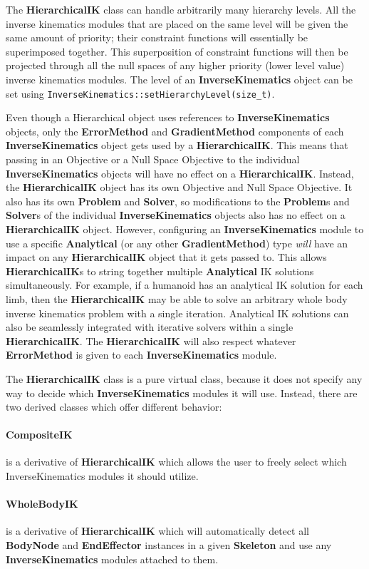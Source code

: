 The \textbf{HierarchicalIK} class can handle arbitrarily many hierarchy levels. All the inverse kinematics modules that are placed on the same level will be given the same amount of priority; their constraint functions will essentially be superimposed together. This superposition of constraint functions will then be projected through all the null spaces of any higher priority (lower level value) inverse kinematics modules. The level of an \textbf{InverseKinematics} object can be set using \texttt{InverseKinematics::setHierarchyLevel(size\_t)}.

Even though a Hierarchical object uses references to \textbf{InverseKinematics} objects, only the \textbf{ErrorMethod} and \textbf{GradientMethod} components of each \textbf{InverseKinematics} object gets used by a \textbf{HierarchicalIK}. This means that passing in an Objective or a Null Space Objective to the individual \textbf{InverseKinematics} objects will have no effect on a \textbf{HierarchicalIK}. Instead, the \textbf{HierarchicalIK} object has its own Objective and Null Space Objective. It also has its own \textbf{Problem} and \textbf{Solver}, so modifications to the \textbf{Problem}s and \textbf{Solver}s of the individual \textbf{InverseKinematics} objects also has no effect on a \textbf{HierarchicalIK} object. However, configuring an \textbf{InverseKinematics} module to use a specific \textbf{Analytical} (or any other \textbf{GradientMethod}) type \textit{will} have an impact on any \textbf{HierarchicalIK} object that it gets passed to. This allows \textbf{HierarchicalIK}s to string together multiple \textbf{Analytical} IK solutions simultaneously. For example, if a humanoid has an analytical IK solution for each limb, then the \textbf{HierarchicalIK} may be able to solve an arbitrary whole body inverse kinematics problem with a single iteration. Analytical IK solutions can also be seamlessly integrated with iterative solvers within a single \textbf{HierarchicalIK}. The \textbf{HierarchicalIK} will also respect whatever \textbf{ErrorMethod} is given to each \textbf{InverseKinematics} module.

The \textbf{HierarchicalIK} class is a pure virtual class, because it does not specify any way to decide which \textbf{InverseKinematics} modules it will use. Instead, there are two derived classes which offer different behavior:

\paragraph{CompositeIK} is a derivative of \textbf{HierarchicalIK} which allows the user to freely select which InverseKinematics modules it should utilize.

\paragraph{WholeBodyIK} is a derivative of \textbf{HierarchicalIK} which will automatically detect all \textbf{BodyNode} and \textbf{EndEffector} instances in a given \textbf{Skeleton} and use any \textbf{InverseKinematics} modules attached to them.